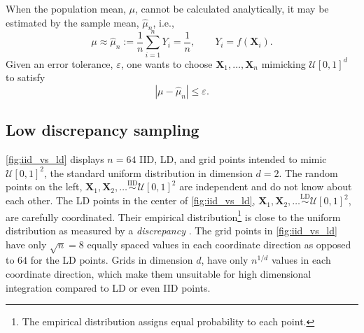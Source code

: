 \documentclass[11pt]{NSFamsart}
\newcommand{\cmtS}[1]{{\color{blue}{(Simon: #1)}}}
\newcommand{\bX}{{\boldsymbol{X}}}
\newcommand{\calu}{{\mathcal{U}}}
\def\abs#1{\ensuremath{\left \lvert #1 \right \rvert}}
\newcommand{\hmu}{\hat{\mu}}
\newcommand{\IIDSim}{\overset{\text{IID}}{\sim}}
\newcommand{\LDSim}{\overset{\text{LD}}{\sim}}
\begin{document}
When the population mean, $\mu$, cannot be calculated analytically, it may be estimated by the sample mean, $\hmu_n$, i.e., 
\begin{equation} \label{eq:mean}
    \mu \approx
\hmu_n := \frac 1n \sum_{i=1}^n Y_i = \frac 1n, \qquad Y_i = f(\bX_i).
\end{equation}
Given an error tolerance, $\varepsilon$, one wants to choose $\bX_1, \ldots, \bX_n$ mimicking $\calu[0,1]^d$ to satisfy
\begin{equation} \label{eq:error_crit}
	\abs{\mu -\hmu_n} \le \varepsilon.
\end{equation}


\subsection{Low discrepancy sampling}
\cmtS{Fred / Yuhan: pls shorten \& focus after my writing above.} 

\cref{fig:iid_vs_ld} displays $n=64$ IID, LD, and grid points intended to mimic $\calu[0,1]^2$, the standard uniform distribution in dimension $d=2$.  The random points on the left, $\bX_1, \bX_2, \ldots \IIDSim \calu[0,1]^2$ are independent and do not know about each other. The  LD points in the center of \cref{fig:iid_vs_ld}, $\bX_1, \bX_2,  \ldots \LDSim \calu[0,1]^2$, are carefully coordinated.  Their empirical distribution\footnote{The empirical distribution assigns equal probability to each point.} 
is close to the uniform distribution as measured by a \emph{discrepancy} \cite{Nie92,Hic99a}.  The grid points in \cref{fig:iid_vs_ld} have only $\sqrt{n} = 8$ equally spaced values in each coordinate direction as opposed to $64$ for the LD points.  Grids in dimension $d$, have only $n^{1/d}$ values in each coordinate direction, which make them unsuitable for high dimensional integration compared to LD or even IID points.
\end{document}
